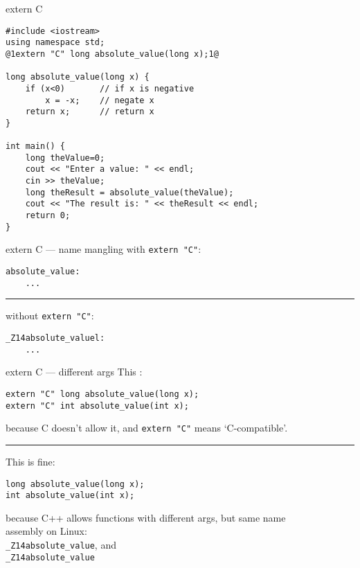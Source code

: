\begin{frame}[fragile,label=absValueCForExternC]{extern \textquotedbl{}C\textquotedbl{}}
\begin{lstlisting}
#include <iostream>
using namespace std;
@1extern "C" long absolute_value(long x);1@

long absolute_value(long x) {
    if (x<0)       // if x is negative
        x = -x;    // negate x
    return x;      // return x
}

int main() {
    long theValue=0;
    cout << "Enter a value: " << endl;
    cin >> theValue;
    long theResult = absolute_value(theValue);
    cout << "The result is: " << theResult << endl;
    return 0;
}
\end{lstlisting}
\end{frame}

\begin{frame}[fragile,label=externCMangle]{extern \textquotedbl{}C\textquotedbl{} --- name mangling}
with \texttt{extern "C"}:
\begin{lstlisting}
absolute_value:
    ...
\end{lstlisting}
\hrule
without \texttt{extern "C"}:
\begin{lstlisting}
_Z14absolute_valuel:
    ...
\end{lstlisting}
\end{frame}

\begin{frame}[fragile,label=externCArgs]{extern C --- different args}
This :
\begin{lstlisting}
extern "C" long absolute_value(long x);
extern "C" int absolute_value(int x);
\end{lstlisting}
because C doesn't allow it, and \texttt{extern "C"} means `C-compatible'.
    \vspace{.5cm}
\hrule
    \vspace{.5cm}
This is fine:
\begin{lstlisting}
long absolute_value(long x);
int absolute_value(int x);
\end{lstlisting}
because C++ allows functions with different args, but same name \\
assembly on Linux: \\
    \hspace{2cm}\texttt{\_Z14absolute\_value}, and \\
    \hspace{2cm}\texttt{\_Z14absolute\_value}
\end{frame}

